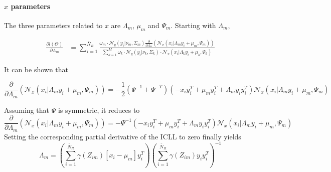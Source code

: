 \paragraph{$x$ parameters}
The three parameters related to $x$ are $\Lambda_m$, $\mu_m$ and $\Psi_m$. Starting with $\Lambda_m$,

\begin{align}
\frac{\partial l(\Theta)}{\partial \Lambda_m} &= \sum\limits_{i = 1}^{\bar{N}_R}
\frac{\omega_m\cdot
\mathcal{N}_y\left(y_i\vert\nu_m,\Sigma_m\right)\frac{\partial }{\partial \Lambda_m}\left(\mathcal{N}_x\left(x_i\vert\Lambda_my_i + \mu_m,\Psi_m\right)\right)}{\sum\limits_{k = 1}^{M}\omega_k\cdot
\mathcal{N}_y\left(y_i\vert\nu_k,\Sigma_k\right)\cdot\mathcal{N}_x\left(x_i\vert\Lambda_ky_i + \mu_k,\Psi_k\right) }
\end{align}

It can be shown that 

\begin{equation}
\frac{\partial }{\partial \Lambda_m}\left(\mathcal{N}_x\left(x_i\vert\Lambda_my_i + \mu_m,\Psi_m\right)\right) = - \frac{1}{2}\left(\Psi^{-1} + \Psi^{-T}\right)\left(-x_iy_i^T + \mu_my_i^T + \Lambda_my_iy_i^T\right)\mathcal{N}_x\left(x_i\vert\Lambda_my_i + \mu_m,\Psi_m\right)
\end{equation}

Assuming that $\Psi$ is symmetric, it reduces to
\begin{equation}
\frac{\partial }{\partial \Lambda_m}\left(\mathcal{N}_x\left(x_i\vert\Lambda_my_i + \mu_m,\Psi_m\right)\right) = -\Psi^{-1}\left(-x_iy_i^T + \mu_my_i^T + \Lambda_my_iy_i^T\right)\mathcal{N}_x\left(x_i\vert\Lambda_my_i + \mu_m,\Psi_m\right)
\end{equation}
Setting the corresponding partial derivative of the ICLL to zero finally yields
\begin{equation}
\boxed{
\Lambda_m =\left(
\sum\limits_{i = 1}^{\bar{N}_R}\gamma(Z_{im})\left[x_i - \mu_m\right]y_i^T\right) \left( \sum\limits_{i = 1}^{\bar{N}_R}\gamma(Z_{im})y_iy_i^T\right)^{-1}
}
\end{equation}





